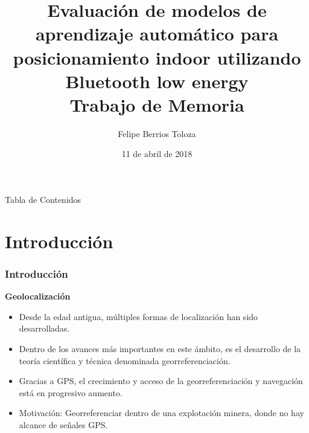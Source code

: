 \documentclass[handout]{beamer}
\title[Evaluación de modelos de aprendizaje automático
para posicionamiento indoor utilizando Bluetooth
low energy]{Evaluación de modelos de aprendizaje automático
para posicionamiento indoor utilizando Bluetooth
low energy\\\normalsize Trabajo de Memoria} %
\author{Felipe Berrios Toloza} %
\institute[UTFSM] %
{
Universidad Técnica Federico Santa María \\ %
\medskip
\textit{felipe.berriost@alumnos.usm.cl} %
}
\date{11 de abril de 2018} %
\begin{document}
\begin{frame}
\titlepage %
\end{frame}

\begin{frame}{Tabla de Contenidos}
\begin{multicols}{2}
  \tableofcontents
\end{multicols}
\end{frame}




\section{Introducción} 

\begin{frame}
\frametitle{Introducción}

\textbf{Geolocalización}
\begin{itemize}


\item Desde la edad antigua, múltiples formas de localización han sido desarrolladas.

\item Dentro de los avances más importantes en este ámbito, es el desarrollo de la teoría científica y técnica denominada georreferenciación.

\item Gracias a GPS, el crecimiento y acceso de la georreferenciación y navegación está en progresivo aumento.

\item Motivación: Georreferenciar dentro de una explotación minera, donde no hay alcance de señales GPS.

\end{itemize}



\end{frame}
\end{document}
